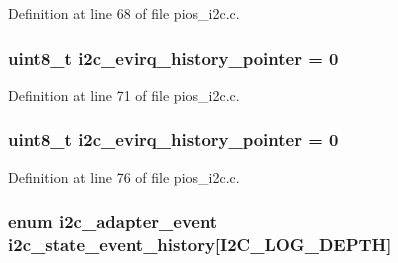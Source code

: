 Definition at line 68 of file pios\-\_\-i2c.\-c.

\hypertarget{group___p_i_o_s___i2_c_gadf5676851d3bae320be666713dd5cb95}{
\subsubsection[{i2c\-\_\-evirq\-\_\-history\-\_\-pointer}]{ {\bf uint8\-\_\-t} i2c\-\_\-evirq\-\_\-history\-\_\-pointer = 0}}\label{group___p_i_o_s___i2_c_gadf5676851d3bae320be666713dd5cb95}


Definition at line 71 of file pios\-\_\-i2c.\-c.

\hypertarget{group___p_i_o_s___i2_c_gadf5676851d3bae320be666713dd5cb95}{
\subsubsection[{i2c\-\_\-evirq\-\_\-history\-\_\-pointer}]{ {\bf uint8\-\_\-t} i2c\-\_\-evirq\-\_\-history\-\_\-pointer = 0}}\label{group___p_i_o_s___i2_c_gadf5676851d3bae320be666713dd5cb95}


Definition at line 76 of file pios\-\_\-i2c.\-c.

\hypertarget{group___p_i_o_s___i2_c_gad2fddef6926d27512901cbe84b7b99bd}{
\subsubsection[{i2c\-\_\-state\-\_\-event\-\_\-history}]{\setlength{\rightskip}{0pt plus 5cm}enum {\bf i2c\-\_\-adapter\-\_\-event} i2c\-\_\-state\-\_\-event\-\_\-history\mbox{[}I2\-C\-\_\-\-L\-O\-G\-\_\-\-D\-E\-P\-T\-H\mbox{]}}}\label{group___p_i_o_s___i2_c_gad2fddef6926d27512901cbe84b7b99bd}


